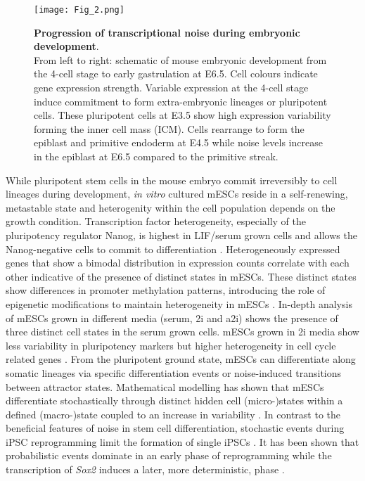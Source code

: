 \begin{figure}[!h]
\centering
\texttt{[image: Fig\_2.png]}
\caption[Progression of transcriptional heterogeneity during embryonic development]{\textbf{Progression of transcriptional noise during embryonic development}.\\
From left to right: schematic of mouse embryonic development from the 4-cell stage to early gastrulation at E6.5. 
Cell colours indicate gene expression strength. Variable expression at the 4-cell stage induce commitment to form extra-embryonic lineages or pluripotent cells. 
These pluripotent cells at E3.5 show high expression variability forming the inner cell mass (ICM). 
Cells rearrange to form the epiblast and primitive endoderm at E4.5 while noise levels increase in the epiblast at E6.5 compared to the primitive streak.}
\label{fig0:noise_development}
\end{figure}

While pluripotent stem cells in the mouse embryo commit irreversibly to cell lineages during development, \emph{in vitro} cultured \glspl{mESC} reside in a self-renewing, metastable state \citep{Hayashi2008} and heterogenity within the cell population depends on the growth condition. 
Transcription factor heterogeneity, especially of the pluripotency regulator Nanog, is highest in \gls{LIF}/serum grown cells and allows the Nanog-negative cells to commit to differentiation \citep{Chickarmane2012, Torres-Padilla2014}. 
Heterogeneously expressed genes that show a bimodal distribution in expression counts correlate with each other indicative of the presence of distinct states in mESCs. 
These distinct states show differences in promoter methylation patterns, introducing the role of epigenetic modifications to maintain heterogeneity in mESCs \citep{Singer2014}. 
In-depth analysis of mESCs grown in different media (serum, \gls{2i} and \gls{a2i}) shows the presence of three distinct cell states in the serum grown cells. 
mESCs grown in 2i media show less variability in pluripotency markers but higher heterogeneity in cell cycle related genes \citep{Kolodziejczyk2015cell}. 
From the pluripotent ground state, mESCs can differentiate along somatic lineages via specific differentiation events or noise-induced transitions between attractor states. 
Mathematical modelling has shown that mESCs differentiate stochastically through distinct hidden cell (micro-)states within a defined (macro-)state coupled to an increase in variability \cite{Stumpf2017}.
In contrast to the beneficial features of noise in stem cell differentiation, stochastic events during \gls{iPSC} reprogramming limit the formation of single iPSCs \citep{Hanna2009, Yamanaka2009}. 
It has been shown that probabilistic events dominate in an early phase of reprogramming while the transcription of \textit{Sox2} induces a later, more deterministic, phase \cite{Buganim2012}.\\

